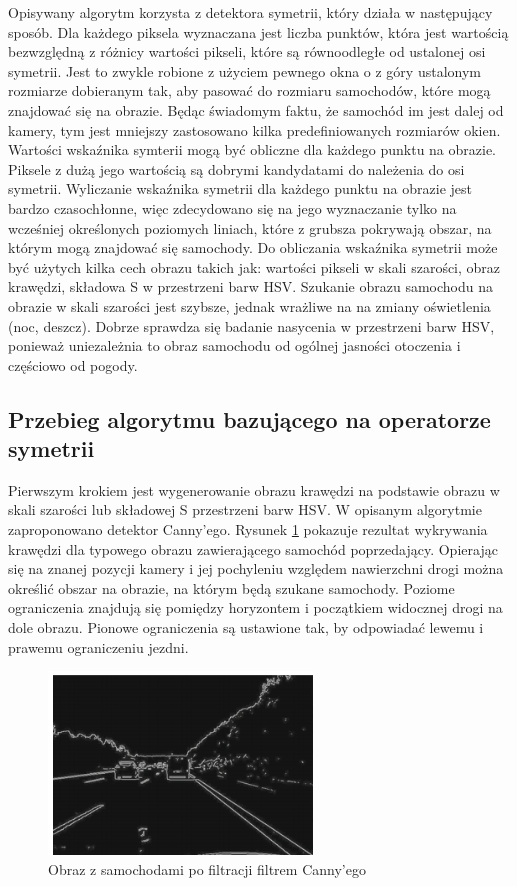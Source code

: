 Opisywany algorytm korzysta z detektora symetrii, który działa w następujący sposób. Dla każdego piksela wyznaczana jest liczba punktów, która jest wartością bezwzględną z różnicy wartości pikseli, które są równoodległe od ustalonej osi symetrii. Jest to zwykle robione z użyciem pewnego okna o z góry ustalonym rozmiarze dobieranym tak, aby pasować do rozmiaru samochodów, które mogą znajdować się na obrazie. Będąc świadomym faktu, że samochód im jest dalej od kamery, tym jest mniejszy zastosowano kilka predefiniowanych rozmiarów okien. Wartości wskaźnika symterii mogą być obliczne dla każdego punktu na obrazie. Piksele z dużą jego wartością są dobrymi kandydatami do należenia do osi symetrii. Wyliczanie wskaźnika symetrii dla każdego punktu na obrazie jest bardzo czasochłonne, więc zdecydowano się na jego wyznaczanie tylko na wcześniej określonych poziomych liniach, które z grubsza pokrywają obszar, na którym mogą znajdować się samochody. Do obliczania wskaźnika symetrii może być użytych kilka cech obrazu takich jak: wartości pikseli w skali szarości, obraz krawędzi, składowa S w przestrzeni barw HSV. Szukanie obrazu samochodu na obrazie w skali szarości jest szybsze, jednak wrażliwe na na zmiany oświetlenia (noc, deszcz). Dobrze sprawdza się badanie nasycenia w przestrzeni barw HSV, ponieważ uniezależnia to obraz samochodu od ogólnej jasności otoczenia i częściowo od pogody.

\subsection{Przebieg algorytmu bazującego na operatorze symetrii}
Pierwszym krokiem jest wygenerowanie obrazu krawędzi na podstawie obrazu w skali szarości lub składowej S przestrzeni barw HSV. W opisanym algorytmie zaproponowano detektor Canny'ego. Rysunek \ref{fig:car_edge} pokazuje rezultat wykrywania krawędzi dla typowego obrazu zawierającego samochód poprzedający. Opierając się na znanej pozycji kamery i jej pochyleniu względem nawierzchni drogi można określić obszar na obrazie, na którym będą szukane samochody. Poziome ograniczenia znajdują się pomiędzy horyzontem i początkiem widocznej drogi na dole obrazu. Pionowe ograniczenia są ustawione tak, by odpowiadać lewemu i prawemu ograniczeniu jezdni. 

\begin{figure}
  \centering
  \includegraphics[width=7cm]{img/car_canny.png}
  \caption{Obraz z samochodami po filtracji filtrem Canny'ego\cite{T1}}
  \label{fig:car_edge}
\end{figure}

